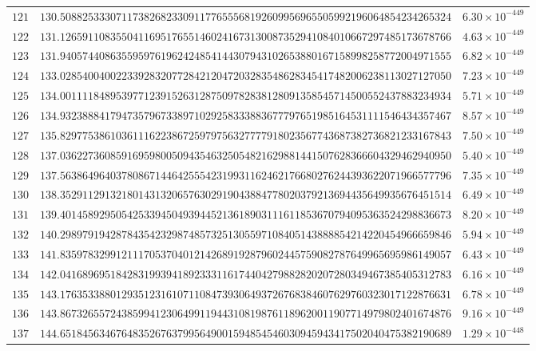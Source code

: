 \documentclass[12pt,reqno]{amsart}
\theoremstyle{remark}
\begin{document}
\begin{longtable}{clc}
$121$ & $130.5088253330711738268233091177655568192609956965505992196064854234265324$ & $6.30\times 10^{-449}$ \\
$122$ & $131.1265911083550411695176551460241673130087352941084010667297485173678766$ & $4.63\times 10^{-449}$ \\
$123$ & $131.9405744086355959761962424854144307943102653880167158998258772004971555$ & $6.82\times 10^{-449}$ \\
$124$ & $133.0285400400223392832077284212047203283548628345417482006238113027127050$ & $7.23\times 10^{-449}$ \\
$125$ & $134.0011118489539771239152631287509782838128091358545714500552437883234934$ & $5.71\times 10^{-449}$ \\
$126$ & $134.9323888417947357967338971029258333883677797651985164531111546434357467$ & $8.57\times 10^{-449}$ \\
$127$ & $135.8297753861036111622386725979756327777918023567743687382736821233167843$ & $7.50\times 10^{-449}$ \\
$128$ & $137.0362273608591695980050943546325054821629881441507628366604329462940950$ & $5.40\times 10^{-449}$ \\
$129$ & $137.5638649640378086714464255542319931162462176680276244393622071966577796$ & $7.35\times 10^{-449}$ \\
$130$ & $138.3529112913218014313206576302919043884778020379213694435649935676451514$ & $6.49\times 10^{-449}$ \\
$131$ & $139.4014589295054253394504939445213618903111611853670794095363524298836673$ & $8.20\times 10^{-449}$ \\
$132$ & $140.2989791942878435423298748573251305597108405143888854214220454966659846$ & $5.94\times 10^{-449}$ \\
$133$ & $141.8359783299121117053704012142689192879602445759082787649965695986149057$ & $6.43\times 10^{-449}$ \\
$134$ & $142.0416896951842831993941892333116174404279882820207280349467385405312783$ & $6.16\times 10^{-449}$ \\
$135$ & $143.1763533880129351231610711084739306493726768384607629760323017122876631$ & $6.78\times 10^{-449}$ \\
$136$ & $143.8673265572438599412306499119443108198761189620011907714979802401674876$ & $9.16\times 10^{-449}$ \\
$137$ & $144.6518456346764835267637995649001594854546030945943417502040475382190689$ & $1.29\times 10^{-448}$ \\

\end{longtable}
\end{document}
